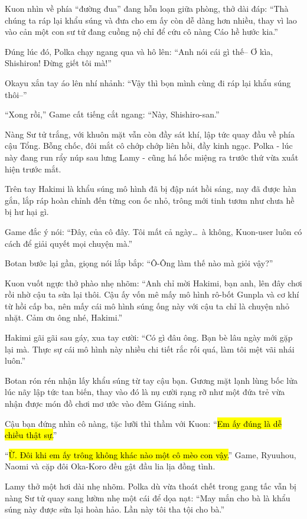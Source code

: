 \documentclass[../main.tex]{subfiles}
\begin{document}
Kuon nhìn về phía ``đường đua'' đang hỗn loạn giữa phòng, thở dài đáp: ``Thà chúng ta ráp lại khẩu súng và đưa cho em ấy còn dễ dàng hơn nhiều, thay vì lao vào cản một con sư tử đang cuồng nộ chỉ để cứu cô nàng Cáo hề hước kia.''

Đúng lúc đó, Polka chạy ngang qua và hô lên: ``Anh nói cái gì thế-- Ơ kìa, Shishiron! Đừng giết tôi mà!''

Okayu xắn tay áo lên nhí nhảnh: ``Vậy thì bọn mình cùng đi ráp lại khẩu súng thôi--''

``Xong rồi,'' Game cất tiếng cắt ngang: ``Này, Shishiro-san.''

Nàng Sư tử trắng, với khuôn mặt vẫn còn đầy sát khí, lập tức quay đầu về phía cậu Tổng. Bỗng chốc, đôi mắt cô chớp chớp liên hồi, đầy kinh ngạc. Polka - lúc này đang run rẩy núp sau lưng Lamy - cũng há hốc miệng ra trước thứ vừa xuất hiện trước mắt.

Trên tay Hakimi là khẩu súng mô hình đã bị đập nát hồi sáng, nay đã được hàn gắn, lắp ráp hoàn chỉnh đến từng con ốc nhỏ, trông mới tinh tươm như chưa hề bị hư hại gì.

Game đắc ý nói: ``Đây, của cô đây. Tôi mất cả ngày\dots\ à không, Kuon-user luôn có cách để giải quyết mọi chuyện mà.''

Botan bước lại gần, giọng nói lắp bắp: ``Ô-Ông làm thế nào mà giỏi vậy?''

Kuon vuốt ngực thở phào nhẹ nhõm: ``Anh chỉ mời Hakimi, bạn anh, lên đây chơi rồi nhờ cậu ta sửa lại thôi. Cậu ấy vốn mê mấy mô hình rô-bốt Gunpla và cơ khí từ hồi cấp ba, nên mấy cái mô hình súng ống này với cậu ta chỉ là chuyện nhỏ nhặt. Cảm ơn ông nhé, Hakimi.''

Hakimi gãi gãi sau gáy, xua tay cười: ``Có gì đâu ông. Bạn bè lâu ngày mới gặp lại mà. Thực sự cái mô hình này nhiều chi tiết rắc rối quá, làm tôi mệt vãi nhái luôn.''

Botan rón rén nhận lấy khẩu súng từ tay cậu bạn. Gương mặt lạnh lùng bốc lửa lúc nãy lập tức tan biến, thay vào đó là nụ cười rạng rỡ như một đứa trẻ vừa nhận được món đồ chơi mơ ước vào đêm Giáng sinh.

Cậu bạn đứng nhìn cô nàng, tặc lưỡi thì thầm với Kuon: ``\hl{Em ấy đúng là dễ chiều thật sự.}''

``\hl{Ừ. Đôi khi em ấy trông không khác nào một cô mèo con vậy.}'' Game, Ryuuhou, Naomi và cặp đôi Oka-Koro đều gật đầu lia lịa đồng tình.

Lamy thở một hơi dài nhẹ nhõm. Polka dù vừa thoát chết trong gang tấc vẫn bị nàng Sư tử quay sang lườm nhẹ một cái để dọa nạt: ``May mắn cho bà là khẩu súng này được sửa lại hoàn hảo. Lần này tôi tha tội cho bà.''
\end{document}

